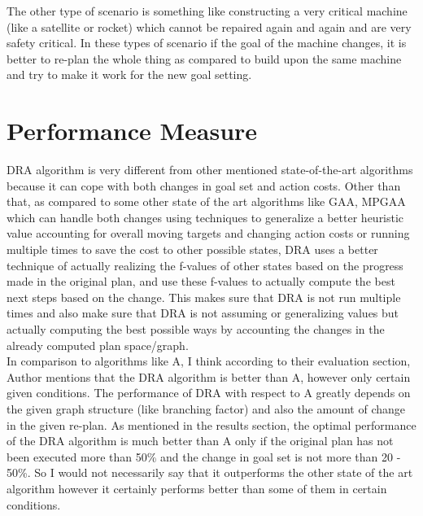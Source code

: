 \documentclass[a4paper]{article}
\begin{document}
The other type of scenario is something like constructing a very critical machine (like a satellite or rocket) which cannot be repaired again and again and are very safety critical. In these types of scenario if the goal of the machine changes, it is better to re-plan the whole thing as compared to build upon the same machine and try to make it work for the new goal setting.
\\

\section{Performance Measure}
\label{sec:Q3}

DRA\text{*} algorithm is very different from other mentioned state-of-the-art algorithms because it can cope with both changes in goal set and action costs. Other than that, as compared to some other state of the art algorithms like GAA\text{*}, MPGAA\text{*} which can handle both changes using techniques to generalize a better heuristic value accounting for overall moving targets and changing action costs or running multiple times to save the cost to other possible states, DRA\text{*} uses a better technique of actually realizing the f-values of other states based on the progress made in the original plan, and use these f-values to actually compute the best next steps based on the change. This makes sure that DRA\text{*} is not run multiple times and also make sure that DRA\text{*} is not assuming or generalizing values but actually computing the best possible ways by accounting the changes in the already computed plan space/graph.
\\

In comparison to algorithms like A\text{*}, I think according to their evaluation section, Author mentions that the DRA\text{*} algorithm is better than A\text{*}, however only certain given conditions. The performance of DRA\text{*} with respect to A\text{*} greatly depends on the given graph structure (like branching factor) and also the amount of change in the given re-plan. As mentioned in the results section, the optimal performance of the DRA\text{*} algorithm is much better than A\text{*} only if the original plan has not been executed more than 50\% and the change in goal set is not more than 20 - 50\%. So I would not necessarily say that it outperforms the other state of the art algorithm however it certainly performs better than some of them in certain conditions.
\end{document}
